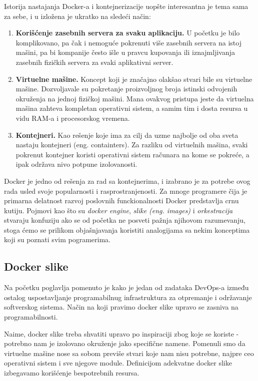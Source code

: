 \documentclass[12pt,oneside]{memoir}
\begin{document}
Istorija nastajanja Docker-a i kontejnerizacije uopšte interesantna je tema sama za sebe, i u \cite{dockerdeepdive} izložena je ukratko na sledeći način:
\begin{enumerate}
    \item \textbf{Korišćenje zasebnih servera za svaku aplikaciju.} U početku je bilo komplikovano, pa čak i nemoguće pokrenuti više zasebnih servera na istoj mašini, pa bi kompanije često išle u pravcu kupovanja ili iznajmljivanja zasebnih fizičkih servera za svaki aplikativni server.
    \item \textbf{Virtuelne mašine.} Koncept koji je značajno olakšao stvari bile su virtuelne mašine. Dozvoljavale su pokretanje proizvoljnog broja istinski odvojenih okruženja na jednoj fizičkoj mašini. Mana ovakvog pristupa jeste da virtuelna mašina zahteva kompletan operativni sistem, a samim tim i dosta resursa u vidu RAM-a i procesorskog vremena.
    \item \textbf{Kontejneri.} Kao rešenje koje ima za cilj da uzme najbolje od oba sveta nastaju kontejneri (eng. containters). Za razliku od virtuelnih mašina, svaki pokrenut kontejner koristi operativni sistem računara na kome se pokreće, a ipak održava nivo potpune izolovanosti.
\end{enumerate}

Docker je jedno od rešenja za rad sa kontejnerima, i izabrano je za potrebe ovog rada usled svoje popularnosti i rasprostranjenosti. Za mnoge programere čija je primarna delatnost razvoj poslovnih funckionalnosti Docker predstavlja crnu kutiju. Pojmovi kao što su \textit{docker engine}, \textit{slike (eng. images)} i \textit{orkestracija} stvaraju konfuziju ako se od početka ne posveti pažnja njihovom razumevanju, stoga ćemo se prilikom objašnjavanja koristiti analogijama sa nekim konceptima koji su poznati svim pogramerima.

\subsection{Docker slike}

Na početku poglavlja pomenuto je kako je jedan od zadataka DevOps-a između ostalog uspostavljanje programabilnug infrastruktura za otpremanje i održavanje softverskog sistema. Način na koji pravimo docker slike upravo se zasniva na programabilnosti. 

Naime, docker slike treba shvatiti upravo po inspiraciji zbog koje se koriste - potrebno nam je izolovano okruženje jako specifične namene. Pomenuli smo da virtuelne mašine nose sa sobom previše stvari koje nam nisu potrebne, najpre ceo operativni sistem i sve njegove module. Definicijom adekvatne docker slike izbegavamo korišćenje bespotrebnih resursa. 
\end{document}
